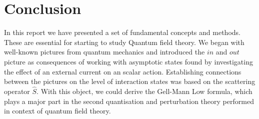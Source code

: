 \documentclass[12pt, titlepage]{article}
\begin{document}
\section{Conclusion}
In this report we have presented a set of fundamental concepts and methods. These are essential for starting to study Quantum field theory. We began with well-known pictures from quantum mechanics and introduced the $ in $ and $ out $ picture as consequences of working with asymptotic states found by investigating the effect of an external current on an scalar action. Establishing connections between the pictures on the level of interaction states was based on the scattering operator $ \hat{S} $. With this object, we could derive the Gell-Mann Low formula, which plays a major part in the second quantisation and perturbation theory performed in context of quantum field theory. 
\newpage
\end{document}
